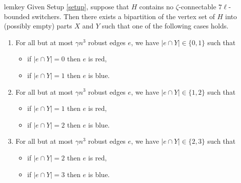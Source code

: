 \documentclass[A4paper,12pt]{article}
\theoremstyle{definition}
\begin{document}
\begin{restatable}{lem}{key}
\label{lem:key}
   Given Setup \ref{setup}, suppose that $H$ contains no $\zeta$-connectable $7\ell$-bounded switchers. Then there exists a bipartition of the vertex set of $H$ into (possibly empty) parts $X$ and $Y$ such that one of the following cases holds. 
    \begin{enumerate}[{Case} A.]
        \item For all but at most $\gamma n^3$ robust edges $e$, we have $|e\cap Y| \in \{0,1\}$ such that
        \begin{itemize}
            \item if $|e\cap Y| = 0$ then $e$ is red,
            \item if  $|e\cap Y| = 1$ then $e$ is blue.
        \end{itemize}
        \item For all but at most $\gamma n^3$ robust edges $e$, we have $|e\cap Y| \in \{1,2\}$ such that
        \begin{itemize}
            \item if $|e\cap Y| = 1$ then $e$ is red,
            \item if  $|e\cap Y| = 2$ then $e$ is blue.
        \end{itemize}
       \item For all but at most $\gamma n^3$ robust edges $e$, we have $|e\cap Y| \in \{2,3\}$ such that
        \begin{itemize}
            \item if $|e\cap Y| = 2$ then $e$ is red,
            \item if  $|e\cap Y| = 3$ then $e$ is blue.
        \end{itemize}
    \end{enumerate}
\end{restatable}
\end{document}

